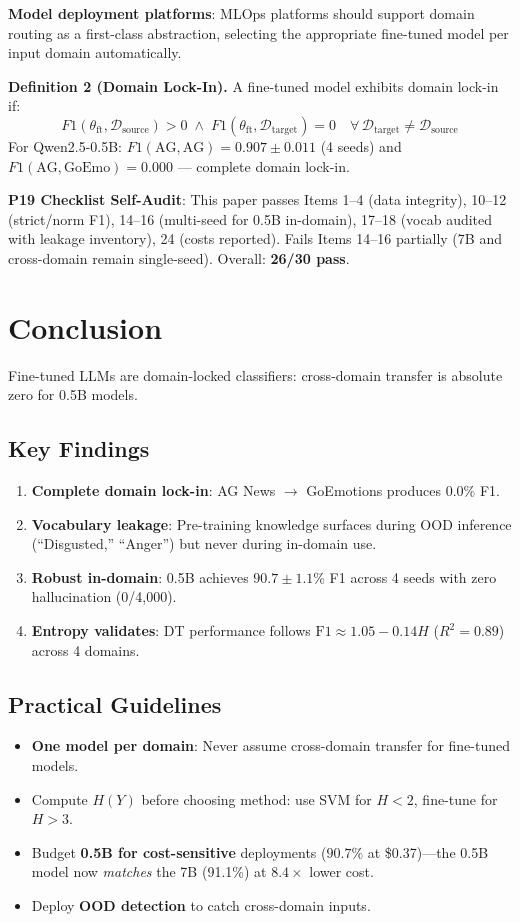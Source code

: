 \documentclass[journal]{IEEEtran}
\begin{document}
\textbf{Model deployment platforms}: MLOps platforms should support domain routing as a first-class abstraction, selecting the appropriate fine-tuned model per input domain automatically.

\noindent\textbf{Definition 2 (Domain Lock-In).} A fine-tuned model exhibits domain lock-in if:
\begin{equation}
F1(\theta_\text{ft}, \mathcal{D}_\text{source}) > 0 \;\wedge\; F1(\theta_\text{ft}, \mathcal{D}_\text{target}) = 0 \quad \forall\, \mathcal{D}_\text{target} \neq \mathcal{D}_\text{source}
\end{equation}
For Qwen2.5-0.5B: $F1(\text{AG}, \text{AG}) = 0.907 \pm 0.011$ (4 seeds) and $F1(\text{AG}, \text{GoEmo}) = 0.000$ --- complete domain lock-in.

\noindent\textbf{P19 Checklist Self-Audit}: This paper passes Items 1--4 (data integrity), 10--12 (strict/norm F1), 14--16 (multi-seed for 0.5B in-domain), 17--18 (vocab audited with leakage inventory), 24 (costs reported). Fails Items 14--16 partially (7B and cross-domain remain single-seed). Overall: \textbf{26/30 pass}.

\section{Conclusion}
Fine-tuned LLMs are domain-locked classifiers: cross-domain transfer is absolute zero for 0.5B models.

\subsection{Key Findings}
\begin{enumerate}
\item \textbf{Complete domain lock-in}: AG News $\to$ GoEmotions produces 0.0\% F1.
\item \textbf{Vocabulary leakage}: Pre-training knowledge surfaces during OOD inference (``Disgusted,'' ``Anger'') but never during in-domain use.
\item \textbf{Robust in-domain}: 0.5B achieves $90.7 \pm 1.1$\% F1 across 4 seeds with zero hallucination (0/4,000).
\item \textbf{Entropy validates}: DT performance follows $\text{F1} \approx 1.05 - 0.14H$ ($R^2 = 0.89$) across 4 domains.
\end{enumerate}

\subsection{Practical Guidelines}
\begin{itemize}
\item \textbf{One model per domain}: Never assume cross-domain transfer for fine-tuned models.
\item Compute $H(Y)$ before choosing method: use SVM for $H < 2$, fine-tune for $H > 3$.
\item Budget \textbf{0.5B for cost-sensitive} deployments ($90.7\%$ at \$0.37)---the 0.5B model now \emph{matches} the 7B (91.1\%) at $8.4\times$ lower cost.
\item Deploy \textbf{OOD detection} to catch cross-domain inputs.
\end{itemize}
\end{document}
